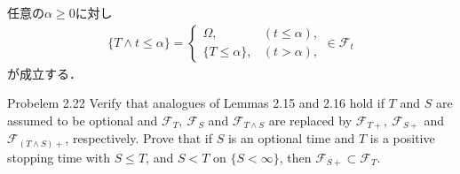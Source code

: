 	\begin{prf}
		任意の$\alpha \geq 0$に対し
		\begin{align}
			\{T \wedge t \leq \alpha\} = 
			\begin{cases}
			\Omega, & (t \leq \alpha), \\
			\{T \leq \alpha \}, & (t > \alpha),
			\end{cases}
			 \in \mathscr{F}_t
		\end{align}
		が成立する．
		\QED
	\end{prf}
	
	\begin{itembox}[l]{Probelem 2.22}
		Verify that analogues of Lemmas 2.15 and 2.16 hold if $T$ and
		$S$ are assumed to be optional and $\mathscr{F}_T,\ \mathscr{F}_S$
		and $\mathscr{F}_{T \wedge S}$ are replaced by $\mathscr{F}_{T+},\ \mathscr{F}_{S+}$
		and $\mathscr{F}_{(T \wedge S)+}$, respectively. Prove that if $S$ is 
		an optional time and $T$ is a positive stopping time with $S \leq T$,
		and $S < T$ on $\{S < \infty\}$, then $\mathscr{F}_{S+} \subset \mathscr{F}_T$.
	\end{itembox}
	
